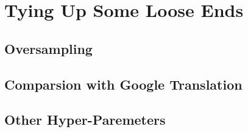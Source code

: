 \documentclass[final]{ua-thesis}
\numberwithin{equation}{section}
\begin{document}


\chapter{Tying Up Some Loose Ends}
\label{chap:Tying_Up}

\section{Oversampling}

\section{Comparsion with Google Translation}

\section{Other Hyper-Paremeters}
\end{document}
